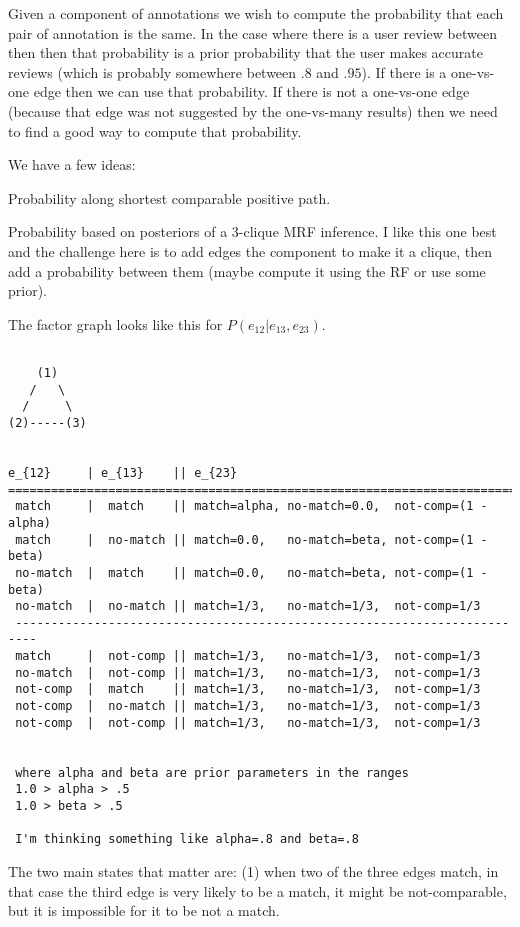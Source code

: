 Given a component of annotations we wish to compute the probability that each
  pair of annotation is the same.
In the case where there is a user review between then then that probability is
  a prior probability that the user makes accurate reviews (which is probably
  somewhere between $.8$ and $.95$).
If there is a one-vs-one edge then we can use that probability.
If there is not a one-vs-one edge (because that edge was not suggested by the one-vs-many results) then we need to find a good way to compute that probability.


We have a few ideas:

Probability along shortest comparable positive path.

Probability based on posteriors of a 3-clique MRF inference.
I like this one best and the challenge here is to add edges the component to
  make it a clique, then add a probability between them (maybe compute it using
  the RF or use some prior).


  The factor graph looks like this for $P(e_{12} | e_{13}, e_{23})$.

\begin{verbatim}

    (1)
   /   \
  /     \
(2)-----(3)


e_{12}     | e_{13}    || e_{23}
==========================================================================
 match     |  match    || match=alpha, no-match=0.0,  not-comp=(1 - alpha)
 match     |  no-match || match=0.0,   no-match=beta, not-comp=(1 - beta)
 no-match  |  match    || match=0.0,   no-match=beta, not-comp=(1 - beta)
 no-match  |  no-match || match=1/3,   no-match=1/3,  not-comp=1/3
 -------------------------------------------------------------------------
 match     |  not-comp || match=1/3,   no-match=1/3,  not-comp=1/3
 no-match  |  not-comp || match=1/3,   no-match=1/3,  not-comp=1/3
 not-comp  |  match    || match=1/3,   no-match=1/3,  not-comp=1/3
 not-comp  |  no-match || match=1/3,   no-match=1/3,  not-comp=1/3
 not-comp  |  not-comp || match=1/3,   no-match=1/3,  not-comp=1/3


 where alpha and beta are prior parameters in the ranges
 1.0 > alpha > .5
 1.0 > beta > .5

 I'm thinking something like alpha=.8 and beta=.8

\end{verbatim}

The two main states that matter are:
(1) when two of the three edges match, in that case the third edge is very
likely to be a match, it might be not-comparable, but it is impossible for it
to be not a match.

